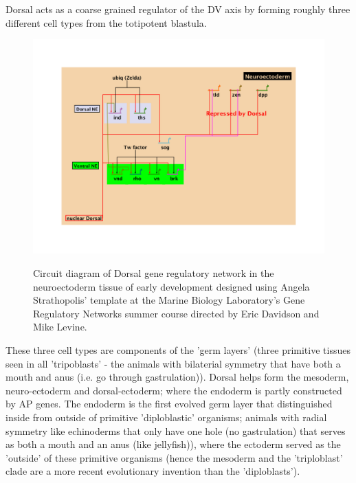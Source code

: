   Dorsal acts as a coarse grained regulator of the DV axis by forming roughly three different cell types from the totipotent blastula.
  
\begin{figure}
  \includegraphics[width=1\textwidth]{slide2jacob}\\
  \caption{Circuit diagram of Dorsal gene regulatory network in the neuroectoderm tissue of early development designed using Angela Strathopolis' template at the Marine Biology Laboratory's Gene Regulatory Networks summer course directed by Eric Davidson and Mike Levine.}\label{shift2}
\end{figure}
  
  
    These three cell types are components of the 'germ layers' (three primitive tissues seen in all 'tripoblasts' - the animals with bilaterial symmetry that have both a mouth and anus (i.e. go through gastrulation)).  Dorsal helps form the mesoderm, neuro-ectoderm and dorsal-ectoderm; where the endoderm is partly constructed by AP genes.  The endoderm is the first evolved germ layer that distinguished inside from outside of primitive 'diploblastic' organisms; animals with radial symmetry like echinoderms that only have one hole (no gastrulation) that serves as both a mouth and an anus (like jellyfish)), where the ectoderm served as the 'outside' of these primitive organisms (hence the mesoderm and the 'triploblast' clade are a more recent evolutionary invention than the 'diploblasts'). 

